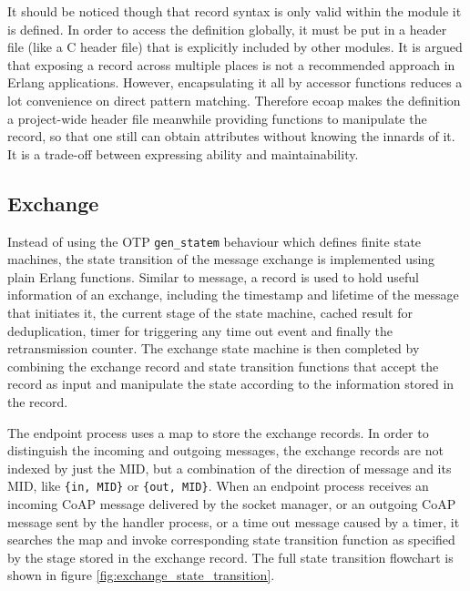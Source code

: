 
It should be noticed though that record syntax is only valid within the module it is defined. In order to access the definition globally, it must be put in a header file (like a C header file) that is explicitly included by other modules. It is argued that exposing a record across multiple places is not a recommended approach in Erlang applications. However, encapsulating it all by accessor functions reduces a lot convenience on direct pattern matching. Therefore ecoap makes the definition a project-wide header file meanwhile providing functions to manipulate the record, so that one still can obtain attributes without knowing the innards of it. It is a trade-off between expressing ability and maintainability. 

\subsection{Exchange}\label{exchange_implementation}

Instead of using the OTP \verb|gen_statem| behaviour which defines finite state machines, the state transition of the message exchange is implemented using plain Erlang functions. Similar to message, a record is used to hold useful information of an exchange, including the timestamp and lifetime of the message that initiates it, the current stage of the state machine, cached result for deduplication, timer for triggering any time out event and finally the retransmission counter. The exchange state machine is then completed by combining the exchange record and state transition functions that accept the record as input and manipulate the state according to the information stored in the record.

The endpoint process uses a map to store the exchange records. In order to distinguish the incoming and outgoing messages, the exchange records are not indexed by just the MID, but a combination of the direction of message and its MID, like \verb|{in, MID}| or \verb|{out, MID}|. When an endpoint process receives an incoming CoAP message delivered by the socket manager, or an outgoing CoAP message sent by the handler process, or a time out message caused by a timer, it searches the map and invoke corresponding state transition function as specified by the stage stored in the exchange record. The full state transition flowchart is shown in figure \ref{fig:exchange_state_transition}.

